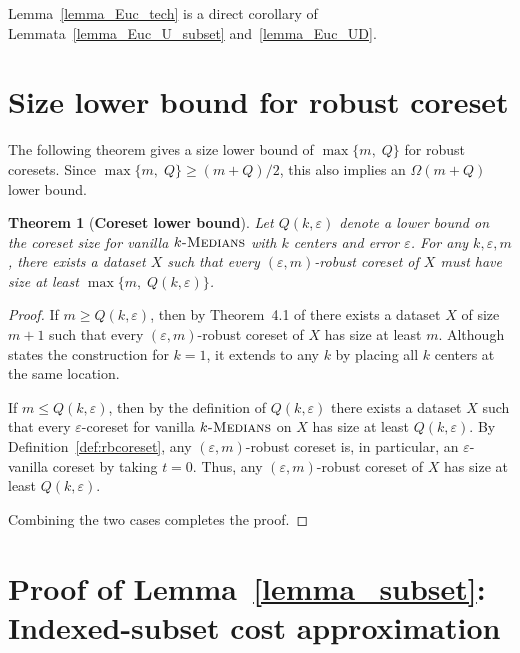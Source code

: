 \documentclass[11pt,letterpaper]{article}
\newtheorem{theorem}{Theorem}[section]
\theoremstyle{definition}
\newcommand{\ProblemName}[1]{\textsc{#1}}
\newcommand{\kMedian}{\ProblemName{$k$-Medians}\xspace}
\begin{document}
Lemma~\ref{lemma_Euc_tech} is a direct corollary of Lemmata~\ref{lemma_Euc_U_subset} and~\ref{lemma_Euc_UD}.





\appendix
\section{Size lower bound for robust coreset}
\label{sec:lb}

The following theorem gives a size lower bound of $\max\{m,\;Q\}$ for robust coresets.
%
Since $\max\{m,\;Q\} \ge (m+Q)/2$, this also implies an $\Omega(m+Q)$ lower bound.
%

\begin{theorem}[\bf{Coreset lower bound}]
\label{thm:lower}
Let $Q(k,\varepsilon)$ denote a lower bound on the coreset size for vanilla $\kMedian$ with $k$ centers and error $\varepsilon$.
%
For any $k,\varepsilon,m$, there exists a dataset $X$ such that every $(\varepsilon,m)$-robust coreset of $X$ must have size at least $\max\{m,\;Q(k,\varepsilon)\}$.
\end{theorem}

\begin{proof}
If $m\ge Q(k,\varepsilon)$, then by Theorem~4.1 of \cite{huang2022near} there exists a dataset $X$ of size $m+1$ such that every $(\varepsilon,m)$-robust coreset of $X$ has size at least $m$.
%
Although \cite{huang2022near} states the construction for $k=1$, it extends to any $k$ by placing all $k$ centers at the same location.

If $m\le Q(k,\varepsilon)$, then by the definition of $Q(k,\varepsilon)$ there exists a dataset $X$ such that every $\varepsilon$-coreset for vanilla $\kMedian$ on $X$ has size at least $Q(k,\varepsilon)$.
%
By Definition~\ref{def:rbcoreset}, any $(\varepsilon,m)$-robust coreset is, in particular, an $\varepsilon$-vanilla coreset by taking $t=0$.
%
Thus, any $(\varepsilon,m)$-robust coreset of $X$ has size at least $Q(k,\varepsilon)$.

Combining the two cases completes the proof.
\end{proof}%
\section{Proof of Lemma~\ref{lemma_subset}: Indexed-subset cost approximation}
\label{sec_proof_subset_appendix}
\end{document}
